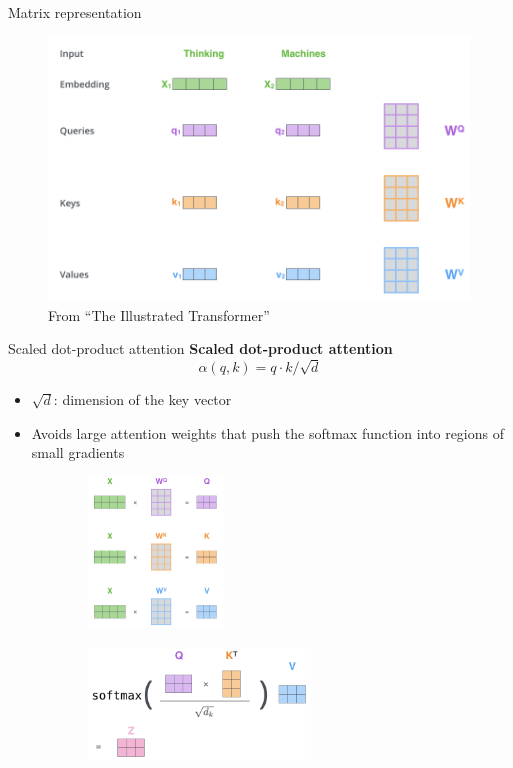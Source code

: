 \documentclass[usenames,dvipsnames,11pt,aspectratio=169]{beamer}
\begin{document}
\begin{frame}
    {Matrix representation}
    \begin{figure}
        \includegraphics[height=7cm]{figures/self-attn-matrix.png}
        \caption{From ``The Illustrated Transformer''}
    \end{figure}
\end{frame}

\begin{frame}
    {Scaled dot-product attention}
    \textbf{Scaled dot-product attention}
    $$
     \alpha(q, k) = q \cdot k / \sqrt{d} 
    $$
    \vspace{-3em}
    \begin{itemize}
        \item $\sqrt{d}$: dimension of the key vector
        \item Avoids large attention weights that push the softmax function into regions of small gradients
    \end{itemize}
    \vspace{-1em}
    \begin{figure}
        \begin{subfigure}{.4\textwidth}
        \includegraphics[height=4cm]{figures/scaled-attn}
        \end{subfigure}
        \begin{subfigure}{.5\textwidth}
        \includegraphics[height=3cm]{figures/scaled-attn-2}
        \end{subfigure}
    \end{figure}
\end{frame}
\end{document}
